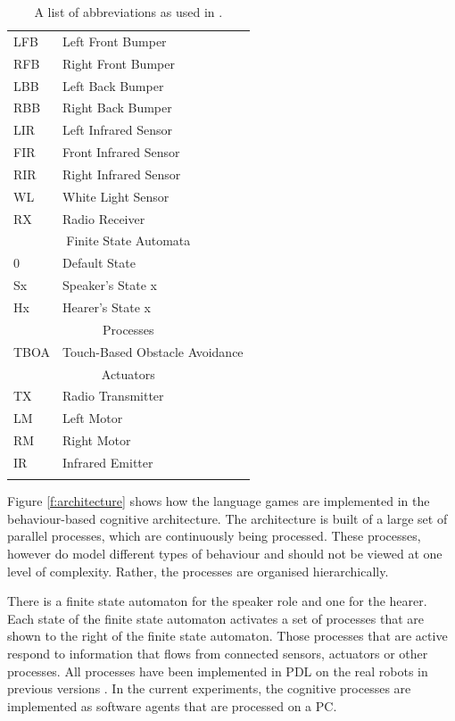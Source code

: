 \begin{table}
\centering
\begin{tabular}{ll}
\lsptoprule
\multicolumn{2}{c}{{\sc Sensors}}\\
\midrule
LFB & Left Front Bumper\\
RFB & Right Front Bumper\\
LBB & Left Back Bumper\\
RBB & Right Back Bumper\\
LIR & Left Infrared Sensor\\
FIR & Front Infrared Sensor\\
RIR & Right Infrared Sensor\\
WL & White Light Sensor\\
RX & Radio Receiver\\
\midrule
\multicolumn{2}{c}{{\sc Finite State Automata}}\\
\midrule
0 & Default State\\
Sx & Speaker's State x\\
Hx & Hearer's State x\\
\midrule
\multicolumn{2}{c}{{\sc Processes}}\\
\midrule
TBOA & Touch-Based Obstacle Avoidance\\
\midrule
\multicolumn{2}{c}{{\sc Actuators}}\\
\midrule
TX & Radio Transmitter\\
LM & Left Motor\\
RM & Right Motor\\
IR & Infrared Emitter\\
\lspbottomrule
\end{tabular}
\caption{A list of abbreviations as used in .}
\label{t:abbr}
\end{table}


Figure \ref{f:architecture} shows how the language games are implemented in the behaviour-based cognitive architecture. The architecture is built of a large set of parallel processes, which are continuously being processed. These processes, however do model different types of behaviour and should not be viewed at one level of complexity. Rather, the processes are organised hierarchically. 

There is a finite state automaton for the speaker role and one for the hearer. Each state of the finite state automaton activates a set of processes that are shown to the right of the finite state automaton. Those processes that are active respond to information that flows from connected sensors, actuators or other processes. All processes have been implemented in PDL on the real robots in previous versions \citep{steelsvogt:1997}. In the current experiments, the cognitive processes are implemented as software agents that are processed on a PC.

